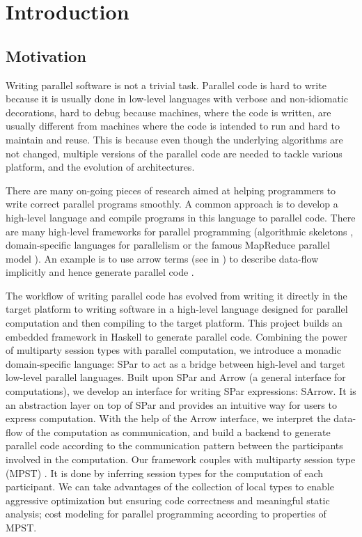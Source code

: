 \tableofcontents
\chapter{Introduction} \label{chap:intro}

\section{Motivation} \label{i:m}
Writing parallel software is not a trivial task. Parallel code is hard to write because it is usually done in low-level languages with verbose and non-idiomatic decorations, hard to debug because machines, where the code is written, are usually different from machines where the code is intended to run and hard to maintain and reuse. This is because even though the underlying algorithms are not changed, multiple versions of the parallel code are needed to tackle various platform, and the evolution of architectures.

There are many on-going pieces of research aimed at helping programmers to write correct parallel programs smoothly. A common approach is to develop a high-level language and compile programs in this language to parallel code. There are many high-level frameworks for parallel programming (\eg algorithmic skeletons \cite{coleAlgorithmicSkeletonsStructured1989}, domain-specific languages for parallelism \cite{brownHeterogeneousParallelFramework2011} or the famous MapReduce parallel model \cite{liMapReduceParallelProgramming2016}). An example is to use arrow terms (see in ) to describe data-flow implicitly and hence generate parallel code \cite{braunArrowsParallelComputation2018}.

The workflow of writing parallel code has evolved from writing it directly in the target platform to writing software in a high-level language designed for parallel computation and then compiling to the target platform. This project builds an embedded framework in Haskell to generate parallel code. Combining the power of multiparty session types with parallel computation, we introduce a monadic domain-specific language: SPar to act as a bridge between high-level and target low-level parallel languages. Built upon SPar and Arrow (a general interface for computations), we develop an interface for writing SPar expressions: SArrow. It is an abstraction layer on top of SPar and provides an intuitive way for users to express computation. With the help of the Arrow interface, we interpret the data-flow of the computation as communication, and build a backend to generate parallel code according to the communication pattern between the participants involved in the computation. Our framework couples with multiparty session type (MPST) \cite{coppoGentleIntroductionMultiparty2015}. It is done by inferring session types for the computation of each participant. We can take advantages of the collection of local types to enable aggressive optimization but ensuring code correctness and meaningful static analysis; \eg cost modeling for parallel programming according to properties of MPST.

